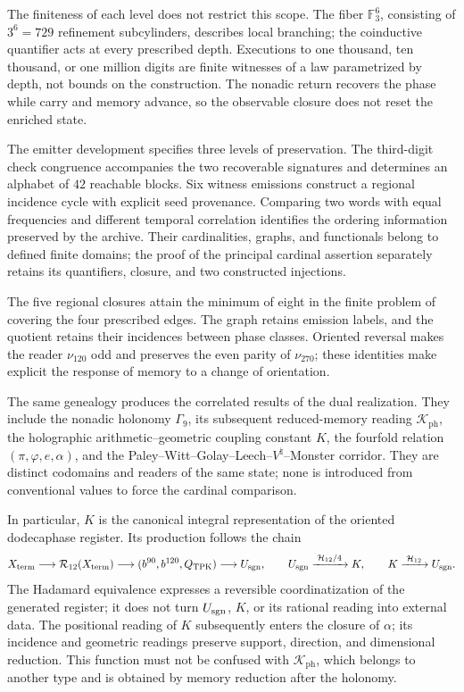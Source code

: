 The finiteness of each level does not restrict this scope. The fiber
\(\mathbb F_3^6\), consisting of \(3^6=729\) refinement subcylinders,
describes local branching; the coinductive quantifier acts at every prescribed
depth. Executions to one thousand, ten thousand, or one million digits are
finite witnesses of a law parametrized by depth, not bounds on the
construction. The nonadic return recovers the phase while carry and memory
advance, so the observable closure does not reset the enriched state.

The emitter development specifies three levels of preservation.
The third-digit check congruence accompanies the two recoverable
signatures and determines an alphabet of \(42\) reachable blocks.
Six witness emissions construct a regional incidence cycle with explicit
seed provenance. Comparing two words with equal frequencies and different
temporal correlation identifies the ordering information preserved by
the archive. Their cardinalities, graphs, and functionals belong to
defined finite domains; the proof of the principal cardinal assertion
separately retains its quantifiers, closure, and two constructed injections.

The five regional closures attain the minimum of eight in the finite
problem of covering the four prescribed edges. The graph retains
emission labels, and the quotient retains their incidences between
phase classes. Oriented reversal makes the reader \(\nu_{120}\) odd
and preserves the even parity of \(\nu_{270}\); these identities
make explicit the response of memory to a change of orientation.

\clearpage
The same genealogy produces the correlated results of the dual
realization. They include the nonadic holonomy \(\Gamma_9\), its subsequent
reduced-memory reading \(\mathcal K_{\mathrm{ph}}\), the holographic
arithmetic--geometric coupling constant \(K\), the fourfold relation
\((\pi,\varphi,e,\alpha)\), and the
Paley--Witt--Golay--Leech--\(V^\natural\)--Monster corridor. They are distinct
codomains and readers of the same state; none is introduced from conventional
values to force the cardinal comparison.

In particular, \(K\) is the canonical integral representation of the oriented
dodecaphase register. Its production follows the chain
\[
 X_{\rm term}\longrightarrow\mathcal R_{12}(X_{\rm term})
 \longrightarrow(b^{90},b^{120},Q_{\rm TPK})
 \longrightarrow U_{\rm sgn},
 \qquad
 U_{\rm sgn}\xrightarrow{\;\mathcal H_{12}/4\;}K,
 \qquad
 K\xrightarrow{\;\mathcal H_{12}\;}U_{\rm sgn}.
\]
The Hadamard equivalence expresses a reversible coordinatization of the
generated register; it does not turn \(U_{\rm sgn}\), \(K\), or its rational
reading into external data. The positional reading of \(K\) subsequently enters
the closure of \(\alpha\); its incidence and geometric readings preserve
support, direction, and dimensional reduction. This function must not be
confused with \(\mathcal K_{\mathrm{ph}}\), which belongs to another type and
is obtained by memory reduction after the holonomy.

